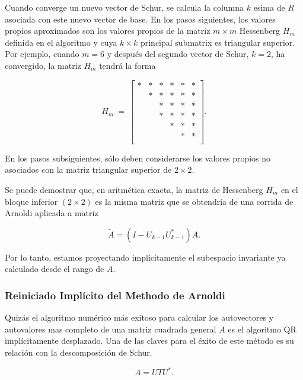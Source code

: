 \documentclass[a4paper,openright,12pt, oneside]{book}
\begin{document}
Cuando converge un nuevo vector de Schur, se calcula la columna $ k $ esima de $ R $ asociada con este nuevo vector de base. En los pasos siguientes, los valores propios aproximados son los valores propios de la matriz $ m \times m $ Hessenberg $ H_m $ definida en el algoritmo y cuya $ k \times k $ principal submatrix es triangular superior. Por ejemplo, cuando $ m = 6 $ y despu\'es del segundo vector de Schur, $ k = 2 $, ha convergido, la matriz $ H_m $ tendr\'a la forma

\begin{displaymath}
H_m ~ = ~
\left[ \begin{array}{cccccc}
* & * & * & * & * & * \\
 & * & * & * & * & * \\
 &  & * & * & * & * \\
 &  & * & * & * & * \\
 &  &  & * & * & * \\
 &  &  &  & * & * \\
\end{array} \right].
\end{displaymath}

En los pasos subsiguientes, s\'olo deben considerarse los valores propios no asociados con la matriz triangular superior de $ 2 \times 2 $.

Se puede demostrar que, en aritm\'etica exacta, la matriz de Hessenberg $ H_m $ en el bloque inferior $ (2 \times 2) $ es la misma matriz que se obtendr\'ia de una corrida de Arnoldi aplicada a matriz

\begin{displaymath}
\tilde A = (I-U_{k-1} U_{k-1}^{\ast} ) A.
\end{displaymath}


Por lo tanto, estamos proyectando impl\'icitamente el subespacio invariante ya calculado desde el rango de $ A $.


\subsubsection{Reiniciado Impl\'icito del Methodo de Arnoldi}

Quiz\'as el algoritmo num\'erico m\'as exitoso para calcular los autovectores y autovalores mas completo de una matriz cuadrada general $ A $ es el algoritmo QR impl\'icitamente desplazado. Una de las claves para el \'exito de este m\'etodo es su relaci\'on con la descomposici\'on de Schur.

\begin{equation}
\label{eq:AUTU}
A = U T U^{\ast}.
\end{equation}
\end{document}
